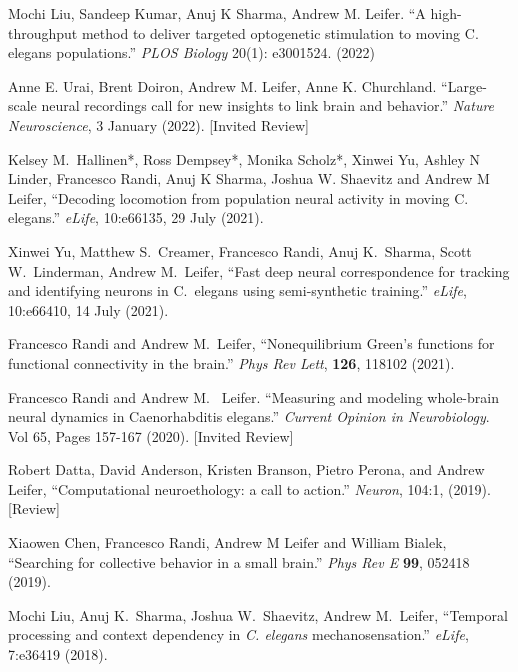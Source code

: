 \documentclass[11pt]{article}
\makeatletter
\newlength{\bibhang}
\newlength{\bibsep}
\newcounter{Lcount}
 {\@listi \global\bibsep\itemsep \global\advance\bibsep by\parsep}
\newenvironment{bibsection}%
        {\begin{list}{\arabic{Lcount}.}{%
       \usecounter{Lcount}%
       \setlength\labelwidth{-0.5em}%
       \setlength{\leftmargin}{\bibhang}%
       \setlength{\itemindent}{-\leftmargin}%
       \setlength{\itemsep}{\bibsep}%
       \setlength{\parsep}{\z@}%
        \setlength{\partopsep}{0pt}%
        \setlength{\topsep}{0pt}}}
        {\end{list}\vspace{-.6\baselineskip}}
\makeatother
\begin{document}
\begin{bibsection}
\item Mochi Liu, Sandeep Kumar, Anuj K Sharma, Andrew M. Leifer. ``A high-throughput method to deliver targeted optogenetic stimulation to moving C. elegans populations.'' \textit{PLOS Biology} 20(1): e3001524. (2022)



\item Anne E. Urai, Brent Doiron, Andrew M. Leifer, Anne K. Churchland. ``Large-scale neural recordings call for new insights to link brain and behavior.'' \textit{Nature Neuroscience}, 3 January (2022). [Invited Review]


\item Kelsey M.~Hallinen*, Ross Dempsey*, Monika Scholz*, Xinwei Yu, Ashley N Linder, Francesco Randi, Anuj K Sharma, Joshua W. Shaevitz and Andrew M Leifer, ``Decoding locomotion from population neural activity in moving C. elegans.'' \emph{eLife}, 10:e66135, 29 July (2021).

\item Xinwei Yu, Matthew S.~Creamer, Francesco Randi, Anuj K.~Sharma, Scott W.~Linderman, Andrew M.~Leifer, ``Fast deep neural correspondence for  tracking and identifying neurons in C.~elegans using semi-synthetic training.'' \emph{eLife}, 10:e66410, 14 July (2021).

\item Francesco Randi and Andrew M.~Leifer, ``Nonequilibrium Green's functions for functional connectivity in the brain.'' \emph{Phys Rev Lett}, \textbf{126}, 118102 (2021).

\item Francesco Randi and Andrew M.~ Leifer. ``Measuring and modeling whole-brain neural dynamics in Caenorhabditis elegans.'' \emph{Current Opinion in Neurobiology}. Vol 65, Pages 157-167 (2020). [Invited Review]

\item Robert Datta, David Anderson, Kristen Branson, Pietro Perona, and Andrew Leifer, ``Computational neuroethology: a call to action.'' \emph{Neuron}, 104:1, (2019). [Review]

\item Xiaowen Chen, Francesco Randi, Andrew M Leifer and William Bialek, ``Searching for collective behavior in a small brain.'' \emph{Phys Rev E} \textbf{99}, 052418 (2019).

\item Mochi Liu, Anuj K.~Sharma, Joshua W.~Shaevitz, Andrew M.~Leifer, ``Temporal processing and context dependency in \textit{C. elegans} mechanosensation.'' \emph{eLife}, 7:e36419 (2018).   


\end{bibsection}
\end{document}
